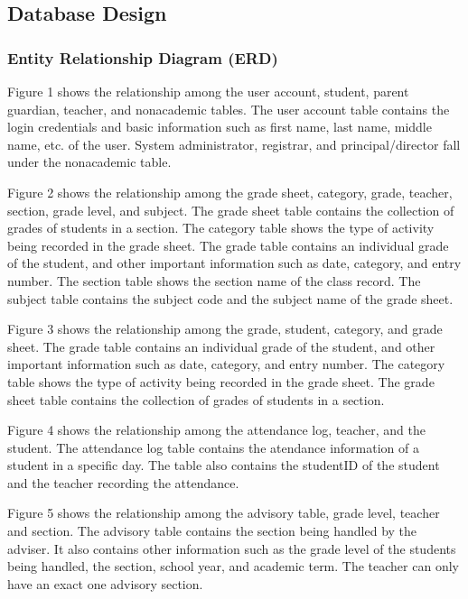 \documentclass[11pt,a4paper,titlepage]{article}
\begin{document}
\subsection{Database Design}

\subsubsection{Entity Relationship Diagram (ERD)}

Figure 1 shows the relationship among the user account, student, parent guardian, teacher, and nonacademic tables. The user account table contains the login credentials and basic information such as first name, last name, middle name, etc. of the user. System administrator, registrar, and principal/director fall under the nonacademic table.

Figure 2 shows the relationship among the grade sheet, category, grade, teacher, section, grade level, and subject. The grade sheet table contains the collection of grades of students in a section. The category table shows the type of activity being recorded in the grade sheet. The grade table contains an individual grade of the student, and other important information such as date, category, and entry number. The section table shows the section name of the class record. The subject table contains the subject code and the subject name of the grade sheet.

Figure 3 shows the relationship among the grade, student, category, and grade sheet. The grade table contains an individual grade of the student, and other important information such as date, category, and entry number. The category table shows the type of activity being recorded in the grade sheet. The grade sheet table contains the collection of grades of students in a section.

Figure 4 shows the relationship among the attendance log, teacher, and the student. The attendance log table contains the atendance information of a student in a specific day. The table also contains the studentID of the student and the teacher recording the attendance. 

Figure 5 shows the relationship among the advisory table, grade level, teacher and section. The advisory table contains the section being handled by the adviser. It also contains other information such as the grade level of the students being handled, the section, school year, and academic term. The teacher can only have an exact one advisory section. 
\end{document}
